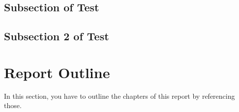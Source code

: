 \subsection{Subsection of Test}
\lipsum[1-2]
\subsection{Subsection 2 of Test}
\lipsum[1-2]

\section{Report Outline}
In this section, you have to outline the chapters of this report by referencing those. 

\lipsum[1-1]